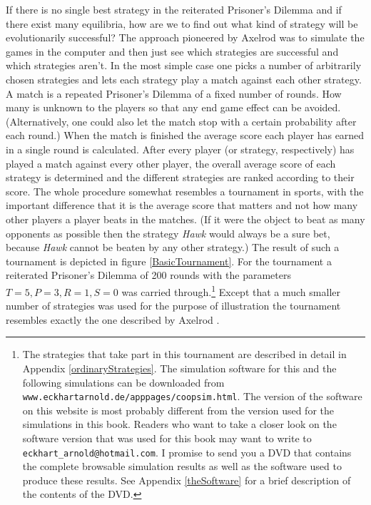 If there is no single best strategy in the reiterated Prisoner's Dilemma and
if there exist many equilibria, how are we to find out what kind of strategy
will be evolutionarily successful? The approach pioneered by Axelrod
\cite[]{axelrod:1984} was to simulate the games in the computer and then just
see which strategies are successful and which strategies aren't. In the most
simple case one picks a number of arbitrarily chosen strategies and lets each
strategy play a match against each other strategy. A match is a repeated
Prisoner's Dilemma of a fixed number of rounds. How many is unknown to the
players so that any end game effect can be avoided. (Alternatively, one could
also let the match stop with a certain probability after each round.)  When
the match is finished the average score each player has earned in a single
round is calculated. After every player (or strategy, respectively) has played
a match against every other player, the overall average score of each strategy
is determined and the different strategies are ranked according to their
score. The whole procedure somewhat resembles a tournament in sports, with
the important difference that it is the average score that matters and not how
many other players a player beats in the matches. (If it were the object to
beat as many opponents as possible then the strategy {\em Hawk} would always be
a sure bet, because {\em Hawk} cannot be beaten by any other strategy.) The
result of such a tournament is depicted in figure \ref{BasicTournament}. For
the tournament a reiterated Prisoner's Dilemma of 200 rounds with the
parameters $T = 5, P = 3, R = 1, S = 0$ was carried through.\footnote{The
strategies that take part in this tournament are described in detail in
Appendix \ref{ordinaryStrategies}. The
  simulation software for this and the following simulations can be downloaded from
  {\tt www.eckhartarnold.de/apppages/coopsim.html}. The version of the 
software on this website is most probably different from the version used for 
the simulations in this book. Readers who want to take a closer look 
on the software version that was used for this book may want to write 
to {\tt eckhart\_arnold@hotmail.com}. I promise to send you a DVD that 
contains the complete browsable simulation results as well as the 
software used to produce these results. See Appendix \ref{theSoftware} for a brief description
  of the contents of the DVD.} Except that a much smaller number of strategies
was used for the purpose of illustration the tournament resembles exactly the
one described by Axelrod \cite[]{axelrod:1984}.

